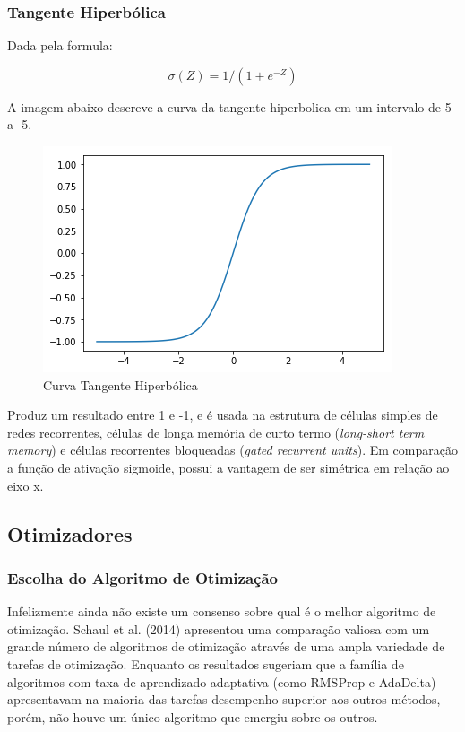 \documentclass[12pt]{article}
\begin{document}
\subsubsection{Tangente Hiperbólica}

Dada pela formula: 

\begin{equation}
    \sigma(Z) = 1/(1+e^{-Z})
\end{equation}

A imagem abaixo descreve a curva da tangente hiperbolica em um intervalo de 5 a -5.

\begin{figure}[ht]
\centering
\includegraphics[width=.5\textwidth]{images/tanh.png}
\caption{Curva Tangente Hiperbólica}
\label{fig:tanh}
\end{figure}

Produz um resultado entre 1 e -1, e é usada na estrutura de células simples de redes recorrentes, células de longa memória de curto termo (\textit{long-short term memory}) e células recorrentes bloqueadas (\textit{gated recurrent units}). Em comparação a função de ativação sigmoide, possui a vantagem de ser simétrica em relação ao eixo x.

\subsection{Otimizadores}

\subsubsection{Escolha do Algoritmo de Otimização}

Infelizmente ainda não existe um consenso sobre qual é o melhor algoritmo de otimização. Schaul et al. (2014) apresentou uma comparação valiosa com um grande número de algoritmos de otimização através de uma ampla variedade de tarefas de otimização. Enquanto os resultados sugeriam que a família de algoritmos com taxa de aprendizado adaptativa (como RMSProp e AdaDelta) apresentavam na maioria das tarefas desempenho superior aos outros métodos, porém, não houve um único algoritmo que emergiu sobre os outros.
\end{document}
